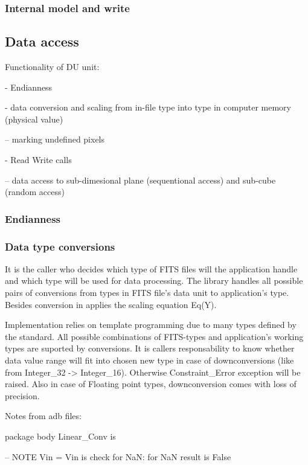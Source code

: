 \documentclass[a4paper,10pt]{article}
\begin{document}
\subsubsection{Internal model and write}



\subsection{Data access}

Functionality of DU unit:

- Endianness

- data conversion and scaling from in-file type into type in computer memory (physical value)

-- marking undefined pixels

- Read Write calls

-- data access to sub-dimesional plane (sequentional access) and sub-cube (random access)



\subsubsection{Endianness}

\subsubsection{Data type conversions}

It is the caller who decides which type of FITS files will the application handle and
which type will be used for data processing. The library handles all possible pairs of
conversions from types in FITS file's data unit to application's type.
Besides conversion in applies the scaling equation Eq(Y).

Implementation relies on template programming due to many types defined by the standard. 
All possible combinations of FITS-types and application's working types are suported
by conversions. It is callers responsability to know whether data value range will fit
into chosen new type in case of downconversions (like from Integer\_32 -> Integer\_16).
Otherwise Constraint\_Error exception will be raised.
Also in case of Floating point types, downconversion comes with loss of precision.

Notes from adb files:

package body Linear\_Conv is

-- NOTE Vin = Vin is check for NaN: for NaN result is False
\end{document}
